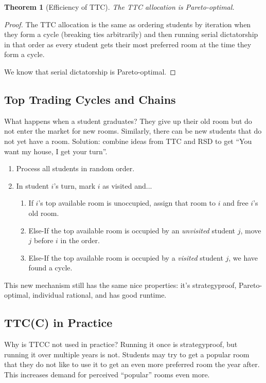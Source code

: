 \documentclass[dvipsnames]{article}
\newtheorem{theorem}{Theorem}[section]
\theoremstyle{definition}
\theoremstyle{remark}
\newenvironment{mech}[1]{\begin{tcolorbox}[colback=red!5!white,colframe=red!75!black,title={#1}]}{\end{tcolorbox}}
\begin{document}
\begin{theorem}[Efficiency of TTC]
	The TTC allocation is Pareto-optimal. 
\end{theorem}

\begin{proof}
	The TTC allocation is the same as ordering students by iteration when they form a cycle (breaking ties arbitrarily) and then running serial dictatorship in that order as every student gets their most preferred room at the time they form a cycle.
	
	We know that serial dictatorship is Pareto-optimal. 
\end{proof}

\subsection{Top Trading Cycles and Chains}
What happens when a student graduates? They give up their old room but do not enter the market for new rooms. 
Similarly, there can be new students that do not yet have a room. 
Solution: combine ideas from TTC and RSD to get ``You want my house, I get your turn''.

\begin{mech}{Top Trading Cycles with Chains}
	\begin{enumerate}
		\item Process all students in random order.
		\item In student $i$'s turn, mark $i$ as visited and...
		\begin{enumerate}
			\item If $i$'s top available room is unoccupied, assign that room to $i$ and free $i$'s old room.
			\item Else-If the top available room is occupied by an \textit{unvisited} student $j$, move $j$ before $i$ in the order.
			\item Else-If the top available room is occupied by a \textit{visited} student $j$, we have found a cycle.
		\end{enumerate}
	\end{enumerate}
\end{mech}

This new mechanism still has the same nice properties: it's strategyproof, Pareto-optimal, individual rational, and has good runtime.

\subsection{TTC(C) in Practice}
Why is TTCC not used in practice? 
Running it once is strategyproof, but running it over multiple years is not. 
Students may try to get a popular room that they do not like to use it to get an even more preferred room the year after. 
This increases demand for perceived ``popular'' rooms even more.
\end{document}
